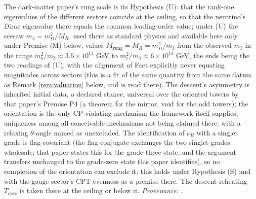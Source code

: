 The dark-matter paper's rung scale is its Hypothesis (U): that the rank-one eigenvalues of the different sectors coincide at the ceiling, so that the neutrino's Dirac eigenvalue there equals the common leading-order value; under (U) the seesaw $m_{3} = m_{D}^{2}/M_{R}$, used there as standard physics and available here only under Premise (M) below, values $M_{\mathrm{rung}} = M_{R} = m_{D}^{2}/m_{3}$ from the observed $m_{3}$ in the range $m_{b}^{2}/m_{3} \approx 3.5 \times 10^{11}$ GeV to $m_{t}^{2}/m_{3} \approx 6 \times 10^{14}$ GeV, the ends being the two readings of (U), with the alignment of Fact  explicitly never equating magnitudes across sectors (this is a fit of the same quantity from the same datum as Remark \ref{rem:valuation} below, and is read there). The descent's asymmetry is inherited initial data, a declared stance, universal over the oriented towers by that paper's Premise P4 (a theorem for the mirror, void for the odd towers); the orientation is the only CP-violating mechanism the framework itself supplies, uniqueness among all conceivable mechanisms not being claimed there, with a relaxing $\theta$-angle named as unexcluded. The identification of $\nu_{R}$ with a singlet grade is flag-covariant (the flag conjugate exchanges the two singlet grades wholesale; that paper states this for the grade-three state, and the argument transfers unchanged to the grade-zero state this paper identifies), so no completion of the orientation can exclude it; this holds under Hypothesis (S) and with the gauge sector's CPT-evenness as a premise there. The descent reheating $T_{\mathrm{desc}}$ is taken there at the ceiling or below it. \emph{Provenance:} \cite[Prop.~6.4, Prop.~5.1, Prop.~5.2, App.~A]{ButlerT14}.
